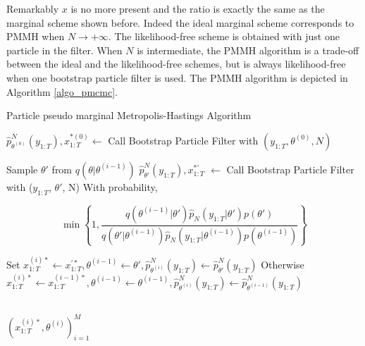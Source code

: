 \documentclass[11pt,a4,twosided,singlespacing,titlepagenumber=on]{scrreprt}
\numberwithin{equation}{chapter} %
\theoremstyle{remark}
\begin{document}
Remarkably $x$ is no more present and the ratio is exactly the same as the marginal scheme shown before. Indeed the ideal marginal scheme corresponds to PMMH when $N \rightarrow +\infty$. The likelihood-free scheme is obtained with just one particle in the filter. When $N$ is intermediate, the PMMH algorithm is a trade-off between the ideal and the likelihood-free schemes, but is always likelihood-free when one bootstrap particle filter is used. The PMMH algorithm is depicted in Algorithm \ref{algo_pmcmc}.

\begin{algorithm}
\caption{Particle pseudo marginal Metropolis-Hastings Algorithm}\label{algo_pmcmc}
\begin{algorithmic}[1]

\State $\hat{p}^N_{\theta^{(0)}}(y_{1:T}), x^{*(0)}_{1:T} \gets$ Call Bootstrap Particle Filter with $(y_{1:T}, \theta^{(0)}, N)$

	\State Sample $\theta'$ from $q(\theta|\theta^{(i-1)})$
	\State $\hat{p}^N_{\theta'}(y_{1:T}), x^{*'}_{1:T}$ $ \gets$ Call Bootstrap Particle Filter with ($y_{1:T}$, $\theta'$, N)
	\State With probability,
	
	$$\min \left\{1, \frac{q(\theta^{(i-1)}|\theta')\hat{p}_N(y_{1:T}|\theta')p(\theta')}{q(\theta'|\theta^{(i-1)})\hat{p}_N(y_{1:T}|\theta^{(i-1)})p(\theta^{(i-1)})}  \right\} $$
	
	\State Set $x^{(i)*}_{1:T} \gets x^{'*}_{1:T},\theta^{(i-1)} \gets \theta', \hat{p}^N_{\theta^{(i)}}(y_{1:T}) \gets \hat{p}^N_{\theta'}(y_{1:T})$
	\State Otherwise $x^{(i)*}_{1:T} \gets x^{(i-1)*}_{1:T},\theta^{(i-1)} \gets \theta^{(i-1)}, \hat{p}^N_{\theta^{(i)}}(y_{1:T}) \gets \hat{p}^N_{\theta^{(i-1)}}(y_{1:T})$
	
\\
\EndProcedure
\Return $(x^{(i)*}_{1:T}, \theta^{(i)})_{i=1}^M$

\end{algorithmic}
\end{algorithm}
\end{document}
